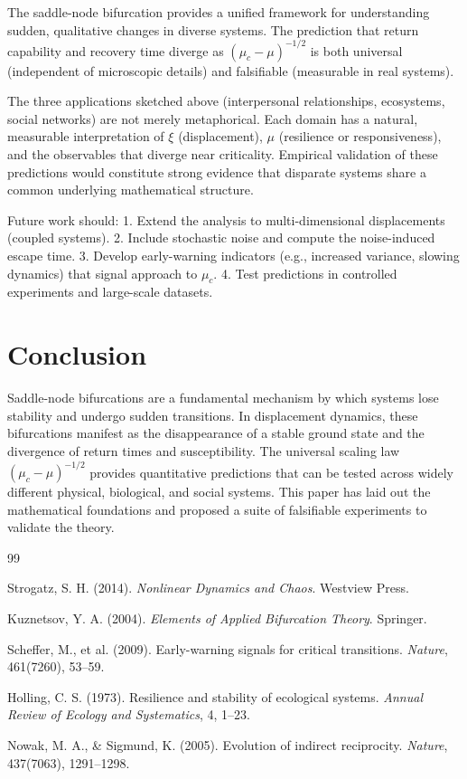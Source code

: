\documentclass[12pt]{article}
\begin{document}
The saddle-node bifurcation provides a unified framework for understanding sudden, qualitative changes in diverse systems. The prediction that return capability and recovery time diverge as $(\mu_c - \mu)^{-1/2}$ is both universal (independent of microscopic details) and falsifiable (measurable in real systems).

The three applications sketched above (interpersonal relationships, ecosystems, social networks) are not merely metaphorical. Each domain has a natural, measurable interpretation of $\xi$ (displacement), $\mu$ (resilience or responsiveness), and the observables that diverge near criticality. Empirical validation of these predictions would constitute strong evidence that disparate systems share a common underlying mathematical structure.

Future work should:
1. Extend the analysis to multi-dimensional displacements (coupled systems).
2. Include stochastic noise and compute the noise-induced escape time.
3. Develop early-warning indicators (e.g., increased variance, slowing dynamics) that signal approach to $\mu_c$.
4. Test predictions in controlled experiments and large-scale datasets.

\section{Conclusion}

Saddle-node bifurcations are a fundamental mechanism by which systems lose stability and undergo sudden transitions. In displacement dynamics, these bifurcations manifest as the disappearance of a stable ground state and the divergence of return times and susceptibility. The universal scaling law $(\mu_c - \mu)^{-1/2}$ provides quantitative predictions that can be tested across widely different physical, biological, and social systems. This paper has laid out the mathematical foundations and proposed a suite of falsifiable experiments to validate the theory.

\begin{thebibliography}{99}

 Strogatz, S. H. (2014). \textit{Nonlinear Dynamics and Chaos}. Westview Press.

 Kuznetsov, Y. A. (2004). \textit{Elements of Applied Bifurcation Theory}. Springer.

 Scheffer, M., et al. (2009). Early-warning signals for critical transitions. \textit{Nature}, 461(7260), 53--59.

 Holling, C. S. (1973). Resilience and stability of ecological systems. \textit{Annual Review of Ecology and Systematics}, 4, 1--23.

 Nowak, M. A., \& Sigmund, K. (2005). Evolution of indirect reciprocity. \textit{Nature}, 437(7063), 1291--1298.

\end{thebibliography}
\end{document}
